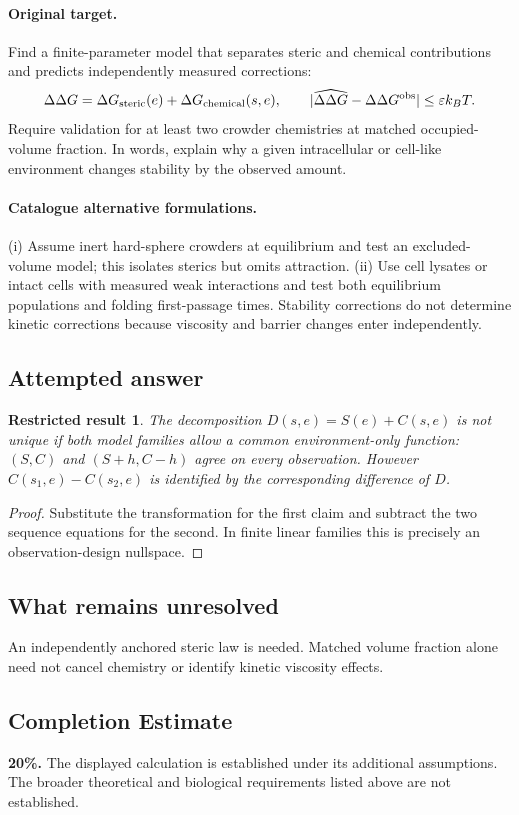 \documentclass[11pt]{article}
\newtheorem{attemptresult}{Restricted result}[section]
\begin{document}
\paragraph{Original target.}
Find a finite-parameter model that separates steric and chemical contributions and predicts independently measured corrections:
\[
\Delta\Delta G=\Delta G_{\rm steric}(e)+\Delta G_{\rm chemical}(s,e),\qquad
|\widehat{\Delta\Delta G}-\Delta\Delta G^{\rm obs}|\leq\varepsilon k_BT.
\]
Require validation for at least two crowder chemistries at matched occupied-volume fraction. In words, explain why a given intracellular or cell-like environment changes stability by the observed amount.
\paragraph{Catalogue alternative formulations.}
(i) Assume inert hard-sphere crowders at equilibrium and test an excluded-volume model; this isolates sterics but omits attraction. (ii) Use cell lysates or intact cells with measured weak interactions and test both equilibrium populations and folding first-passage times. Stability corrections do not determine kinetic corrections because viscosity and barrier changes enter independently.
\subsection{Attempted answer}
\begin{attemptresult}
The decomposition $D(s,e)=S(e)+C(s,e)$ is not unique if both model families allow a common environment-only function: $(S,C)$ and $(S+h,C-h)$ agree on every observation. However $C(s_1,e)-C(s_2,e)$ is identified by the corresponding difference of $D$.
\end{attemptresult}
\begin{proof}
Substitute the transformation for the first claim and subtract the two sequence equations for the second. In finite linear families this is precisely an observation-design nullspace.
\end{proof}
\subsection{What remains unresolved}
An independently anchored steric law is needed. Matched volume fraction alone need not cancel chemistry or identify kinetic viscosity effects.
\subsection{Completion Estimate}
\textbf{20\%.} The displayed calculation is established under its additional assumptions. The broader theoretical and biological requirements listed above are not established.
\end{document}
